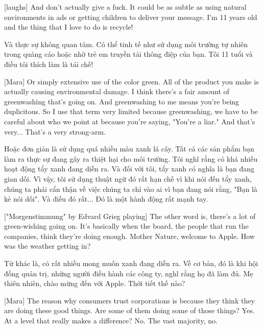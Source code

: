 \documentclass[a4paper]{article}
\begin{document}
	[laughs]
	And don't actually give a fuck.
	It could be as subtle as using natural environments in ads or getting children to deliver your message.
	I'm 11 years old and the thing that I love to do is recycle!

	\begin{vietnamese-v2}
		[cười]
		Và thực sự không quan tâm.
		Có thể tinh tế như sử dụng môi trường tự nhiên trong quảng cáo hoặc nhờ trẻ em truyền tải thông điệp của bạn.
		Tôi 11 tuổi và điều tôi thích làm là tái chế!
	\end{vietnamese-v2}

	[Mara] Or simply extensive use of the color green.
	All of the product you make is actually causing environmental damage.
	I think there's a fair amount of greenwashing that's going on.
	And greenwashing to me means you're being duplicitous.
	So I use that term very limited	because greenwashing, we have to be careful about who we point at because you're saying, "You're a liar."
	And that's very... That's a very strong-arm.
	
	\begin{vietnamese-v2}
		[Mara] Hoặc đơn giản là sử dụng quá nhiều màu xanh lá cây.
		Tất cả các sản phẩm bạn làm ra thực sự đang gây ra thiệt hại cho môi trường.
		Tôi nghĩ rằng có khá nhiều hoạt động tẩy xanh đang diễn ra.
		Và đối với tôi, tẩy xanh có nghĩa là bạn đang gian dối.
		Vì vậy, tôi sử dụng thuật ngữ đó rất hạn chế vì khi nói đến tẩy xanh, chúng ta phải cẩn thận về việc chúng ta chỉ vào ai vì bạn đang nói rằng, "Bạn là kẻ nói dối".
		Và điều đó rất... Đó là một hành động rất mạnh tay.
	\end{vietnamese-v2}
	
	["Morgenstimmung" by Edvard Grieg playing]
	The other word is, there's a lot of green-wishing going on.
	It's basically when the board, the people that run the companies, think they're doing enough.
	Mother Nature, welcome to Apple.
	How was the weather getting in?
	
	\begin{vietnamese-v2}
		Từ khác là, có rất nhiều mong muốn xanh đang diễn ra.
		Về cơ bản, đó là khi hội đồng quản trị, những người điều hành các công ty, nghĩ rằng họ đã làm đủ.
		Mẹ thiên nhiên, chào mừng đến với Apple.
		Thời tiết thế nào?
	\end{vietnamese-v2}
	
	[Mara] The reason why consumers trust corporations is because they think they are doing these good things.
	Are some of them doing some of those things? Yes.
	At a level that really makes a difference? No.
	The vast majority, no.
	
\end{document}

